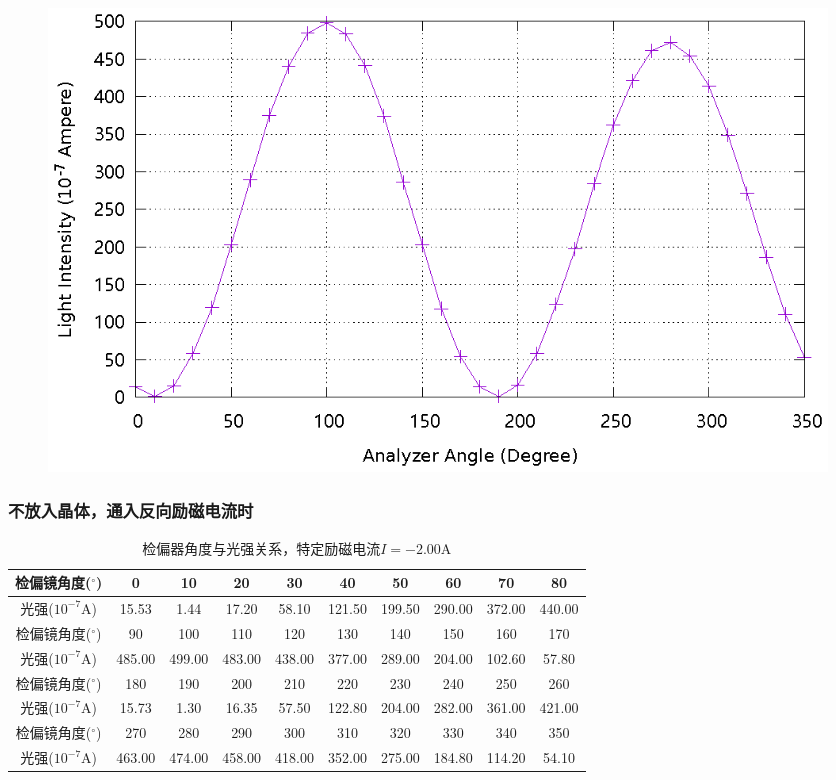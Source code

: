 \documentclass{ctexart}
\newcommand{\si}[1]{\mathrm{#1}}
\let\oldsubsubsection\subsubsection
\renewcommand{\subsubsection}[1]{\oldsubsubsection{\!\!\!\!\!\!#1}}
\begin{document}
\begin{figure}[H]
  \centering
  \includegraphics[width=\linewidth]{optics-figures/analyzer-angle-light-intensity-1.gnuplot}
\end{figure}

\newpage
\subsubsection{不放入晶体，通入反向励磁电流时}

\begin{table}[H]
  \centering
  \begin{tabular}{|c|c|c|c|c|c|c|c|c|c|}
    \hline
    检偏镜角度(${}^{\circ}$)  & 0   & 10  & 20  & 30  & 40  & 50  & 60  & 70  & 80  \\\hline
    光强($10^{-7} \si{A}$) & 15.53 & 1.44 & 17.20 & 58.10 & 121.50 & 199.50 & 290.00 & 372.00 & 440.00 \\\hline
    检偏镜角度(${}^{\circ}$)  & 90  & 100 & 110 & 120 & 130 & 140 & 150 & 160 & 170 \\\hline
    光强($10^{-7} \si{A}$) & 485.00 & 499.00 & 483.00 & 438.00 & 377.00 & 289.00 & 204.00 & 102.60 & 57.80 \\\hline
    检偏镜角度(${}^{\circ}$)  & 180 & 190 & 200 & 210 & 220 & 230 & 240 & 250 & 260 \\\hline
    光强($10^{-7} \si{A}$) & 15.73 & 1.30 & 16.35 & 57.50 & 122.80 & 204.00 & 282.00 & 361.00 & 421.00 \\\hline
    检偏镜角度(${}^{\circ}$)  & 270 & 280 & 290 & 300 & 310 & 320 & 330 & 340 & 350 \\\hline
    光强($10^{-7} \si{A}$) & 463.00 & 474.00 & 458.00 & 418.00 & 352.00 & 275.00 & 184.80 & 114.20 & 54.10 \\\hline
  \end{tabular}
  \caption{检偏器角度与光强关系，特定励磁电流$I=-2.00 \si{A}$}
\end{table}
\end{document}

